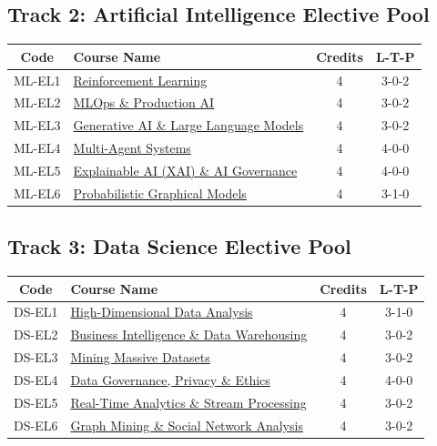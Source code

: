 \subsection*{Track 2: Artificial Intelligence Elective Pool}
\begin{longtable}{|c|p{8cm}|c|c|}
\hline
\textbf{Code} & \textbf{Course Name} & \textbf{Credits} & \textbf{L-T-P} \\
\hline
ML-EL1 & \hyperref[elec:ML_1]{Reinforcement Learning} & 4 & 3-0-2 \\
\hline
ML-EL2 & \hyperref[elec:ML_2]{MLOps \& Production AI} & 4 & 3-0-2 \\
\hline
ML-EL3 & \hyperref[elec:ML_3]{Generative AI \& Large Language Models} & 4 & 3-0-2 \\
\hline
ML-EL4 & \hyperref[elec:ML_4]{Multi-Agent Systems} & 4 & 4-0-0 \\
\hline
ML-EL5 & \hyperref[elec:ML_5]{Explainable AI (XAI) \& AI Governance} & 4 & 4-0-0 \\
\hline
ML-EL6 & \hyperref[elec:ML_6]{Probabilistic Graphical Models} & 4 & 3-1-0 \\
\hline
\end{longtable}

\subsection*{Track 3: Data Science Elective Pool}
\begin{longtable}{|c|p{8cm}|c|c|}
\hline
\textbf{Code} & \textbf{Course Name} & \textbf{Credits} & \textbf{L-T-P} \\
\hline
DS-EL1 & \hyperref[elec:DS_1]{High-Dimensional Data Analysis} & 4 & 3-1-0 \\
\hline
DS-EL2 & \hyperref[elec:DS_2]{Business Intelligence \& Data Warehousing} & 4 & 3-0-2 \\
\hline
DS-EL3 & \hyperref[elec:DS_3]{Mining Massive Datasets} & 4 & 3-0-2 \\
\hline
DS-EL4 & \hyperref[elec:DS_4]{Data Governance, Privacy \& Ethics} & 4 & 4-0-0 \\
\hline
DS-EL5 & \hyperref[elec:DS_5]{Real-Time Analytics \& Stream Processing} & 4 & 3-0-2 \\
\hline
DS-EL6 & \hyperref[elec:DS_6]{Graph Mining \& Social Network Analysis} & 4 & 3-0-2 \\
\hline
\end{longtable}

